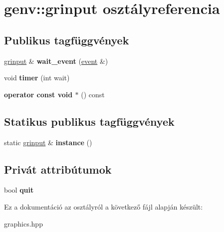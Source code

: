 \hypertarget{classgenv_1_1grinput}{}\section{genv\+:\+:grinput osztályreferencia}
\label{classgenv_1_1grinput}
\subsection*{Publikus tagfüggvények}
\begin{DoxyCompactItemize}
\item 
\mbox{\label{classgenv_1_1grinput_ae4f9d54544e151699f217bdf02243114}} 
\hyperlink{classgenv_1_1grinput}{grinput} \& {\bfseries wait\+\_\+event} (\hyperlink{structgenv_1_1event}{event} \&)
\item 
\mbox{\label{classgenv_1_1grinput_acc7dfa69bbba1020b0400b1684a92516}} 
void {\bfseries timer} (int wait)
\item 
\mbox{\label{classgenv_1_1grinput_a1213762545b4bf7b798216a63ff0130f}} 
{\bfseries operator const void $\ast$} () const
\end{DoxyCompactItemize}
\subsection*{Statikus publikus tagfüggvények}
\begin{DoxyCompactItemize}
\item 
\mbox{\label{classgenv_1_1grinput_aa338fbab6e9e363edcccf05ca83c93ab}} 
static \hyperlink{classgenv_1_1grinput}{grinput} \& {\bfseries instance} ()
\end{DoxyCompactItemize}
\subsection*{Privát attribútumok}
\begin{DoxyCompactItemize}
\item 
\mbox{\label{classgenv_1_1grinput_a213959ea96c33465f5102fb1d9a191ec}} 
bool {\bfseries quit}
\end{DoxyCompactItemize}


Ez a dokumentáció az osztályról a következő fájl alapján készült\+:\begin{DoxyCompactItemize}
\item 
graphics.\+hpp\end{DoxyCompactItemize}
